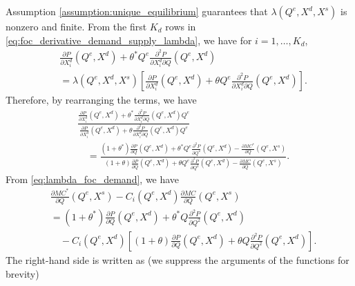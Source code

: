 \documentclass[11pt, a4paper]{article}
\theoremstyle{remark}
\begin{document}
Assumption \ref{assumption:unique_equilibrium} guarantees that $\lambda(Q^e, X^{d}, X^{s})$ is nonzero and finite.
From the first $K_d$ rows in \eqref{eq:foc_derivative_demand_supply_lambda}, we have for $i = 1, \ldots, K_d$,
\begin{align}
    &\frac{\partial P}{\partial X^{d}_{i}}(Q^e, X^{d}) + \theta^{*} Q^e \frac{\partial^2 P}{\partial X^{d}_{i}\partial Q}(Q^e, X^{d})\\  
    &= \lambda(Q^e, X^{d}, X^{s})\left[ \frac{\partial P}{\partial X^{d}_{i}}(Q^e, X^{d}) + \theta Q^e \frac{\partial^2 P}{\partial X^{d}_{i}\partial Q}(Q^e, X^{d}) \right].
\end{align}
Therefore, by rearranging the terms, we have
\begin{align}
    &\frac{\frac{\partial P}{\partial X^{d}_i}(Q^e, X^{d}) + \theta^{*}\frac{\partial^2 P}{\partial X^{d}_{i}\partial Q}(Q^e, X^{d})Q^e }{\frac{\partial P}{\partial X^{d}_i}(Q^e, X^{d}) + \theta\frac{\partial^2 P}{\partial X^{d}_{i}\partial Q}(Q^e, X^{d})Q^e}\\
    &\quad = \frac{(1+\theta^{*})\frac{\partial P}{\partial Q}(Q^e, X^{d}) + \theta^{*} Q^e\frac{\partial^2 P}{\partial Q^2}(Q^e, X^{d}) - \frac{\partial MC^{*}}{\partial Q}(Q^e, X^{s})}{(1+\theta)\frac{\partial P}{\partial Q}(Q^e, X^{d}) + \theta Q^e\frac{\partial^2 P}{\partial Q^2}(Q^e, X^{d}) - \frac{\partial MC}{\partial Q}(Q^e, X^{s})}. \label{eq:lambda_foc_demand}
\end{align}
From \eqref{eq:lambda_foc_demand}, we have
\begin{align}
    &\frac{\partial MC^{*}}{\partial Q}(Q^e, X^{s}) - C_i(Q^e, X^{d})\frac{\partial MC}{\partial Q}(Q^e, X^{s})\\
    & =  (1+ \theta^{*}) \frac{\partial P}{\partial Q}(Q^e, X^{d}) + \theta^{*} Q\frac{\partial^2 P}{\partial Q^2}(Q^e, X^{d})\\
    &\quad - C_i(Q^e, X^{d})\left[(1+ \theta) \frac{\partial P}{\partial Q}(Q^e, X^{d}) + \theta Q\frac{\partial^2 P}{\partial Q^2}(Q^e, X^{d})\right].\label{eq:mc_transformation_1}
\end{align}
The right-hand side is written as (we suppress the arguments of the functions for brevity)
\end{document}
